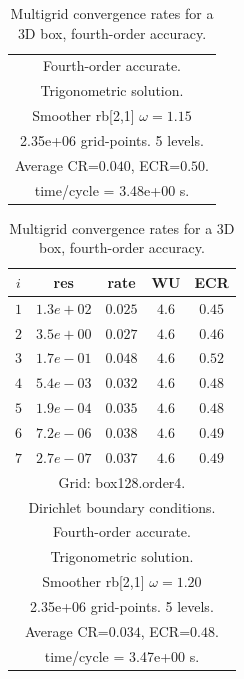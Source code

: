 \begin{table}[hbt]
\begin{center}
\begin{tabular}{|c|c|c|c|c|}
\multicolumn{5}{|c|}{Fourth-order accurate.}  \\
\multicolumn{5}{|c|}{Trigonometric solution.}  \\
\multicolumn{5}{|c|}{Smoother rb[2,1] $\omega=1.15$}  \\
\multicolumn{5}{|c|}{2.35e+06 grid-points. 5 levels.}  \\
\multicolumn{5}{|c|}{Average CR=$0.040$, ECR=$0.50$.}  \\
\multicolumn{5}{|c|}{time/cycle = 3.48e+00 s.}  \\
\hline 
\end{tabular}
\begin{tabular}{|c|c|c|c|c|} \hline 
 $i$   & res      & rate    &  WU    & ECR  \\   \hline 
 $ 1$  & $ 1.3e+02$ & $0.025$ & $ 4.6$ & $0.45$ \\ 
 $ 2$  & $ 3.5e+00$ & $0.027$ & $ 4.6$ & $0.46$ \\ 
 $ 3$  & $ 1.7e-01$ & $0.048$ & $ 4.6$ & $0.52$ \\ 
 $ 4$  & $ 5.4e-03$ & $0.032$ & $ 4.6$ & $0.48$ \\ 
 $ 5$  & $ 1.9e-04$ & $0.035$ & $ 4.6$ & $0.48$ \\ 
 $ 6$  & $ 7.2e-06$ & $0.038$ & $ 4.6$ & $0.49$ \\ 
 $ 7$  & $ 2.7e-07$ & $0.037$ & $ 4.6$ & $0.49$ \\ 
\hline 
\multicolumn{5}{|c|}{Grid: box128.order4.}  \\
\multicolumn{5}{|c|}{Dirichlet boundary conditions.}  \\
\multicolumn{5}{|c|}{Fourth-order accurate.}  \\
\multicolumn{5}{|c|}{Trigonometric solution.}  \\
\multicolumn{5}{|c|}{Smoother rb[2,1] $\omega=1.20$}  \\
\multicolumn{5}{|c|}{2.35e+06 grid-points. 5 levels.}  \\
\multicolumn{5}{|c|}{Average CR=$0.034$, ECR=$0.48$.}  \\
\multicolumn{5}{|c|}{time/cycle = 3.47e+00 s.}  \\
\hline 
\end{tabular}
\end{center}
\caption{Multigrid convergence rates for a 3D box, fourth-order accuracy.}
\label{fig:smoothBox}
\end{table}


